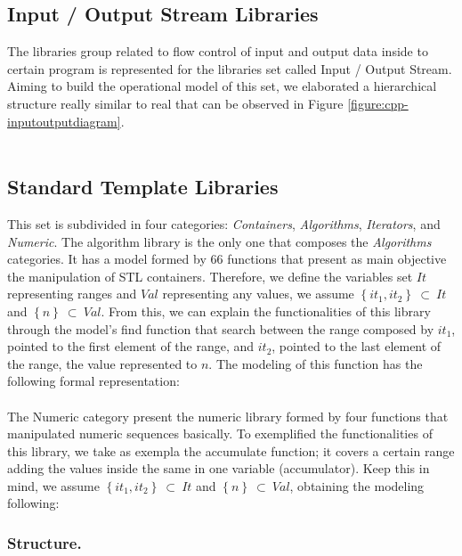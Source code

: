 \documentclass[a4paper]{llncs}
\begin{document}
\subsection{Input / Output Stream Libraries}
%

The libraries group related to flow control of input and output data inside to certain program is represented for the libraries set 
called Input / Output Stream. Aiming to build the operational model of this set, we elaborated a hierarchical structure really similar 
to real that can be observed in Figure \ref{figure:cpp-inputoutputdiagram}.
\\
\\

\subsection{Standard Template Libraries}

This set is subdivided in four categories: \textit{Containers}, \textit{Algorithms}, 
\textit{Iterators}, and \textit{Numeric}. The algorithm library is the only one that 
composes the \textit{Algorithms} categories. It has a model formed by 66 functions 
that present as main objective the manipulation of STL containers. Therefore, we define 
the variables set $It$ representing ranges and $Val$ representing any values, we assume 
$\left\{it_{1}, it_{2}\right\} \:\subset\:It$ and $\left\{n\right\} \:\subset\:Val$. 
From this, we can explain the functionalities of this library through the model's find function 
that search between the range composed by $it_{1}$, pointed to the first element 
of the range, and $it_{2}$, pointed to the last element of the range, the value represented to $n$. 
The modeling of this function has the following formal representation:
\\
\\
The Numeric category present the numeric library formed by four functions that manipulated numeric sequences basically. 
To exemplified the functionalities of this library, we take as exempla the accumulate function; it covers a certain range adding 
the values inside the same in one variable (accumulator). Keep this in mind, we assume $\left\{it_{1}, it_{2}\right\} \:\subset\:It$ 
and $\left\{n\right\} \:\subset\:Val$, obtaining the modeling following:

\subsubsection{Structure.}
\end{document}
